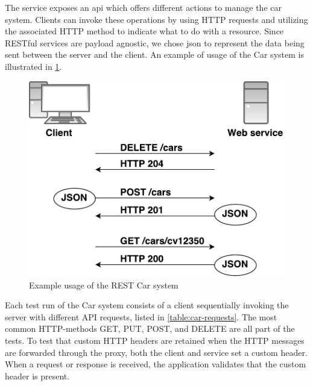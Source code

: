  The service exposes an \gls{api} which offers different actions to manage the
 car system. Clients can invoke these operations by using HTTP requests and
 utilizing the associated HTTP method to indicate what to do with a resource.
 Since RESTful services are payload agnostic, we chose \gls{json} to represent
 the data being sent between the server and the client. An example of usage of
 the Car system is illustrated in \cref{figure-rest-flow}.

\begin{figure}[h]
\centering
\includegraphics[scale=0.6]{images/rest_flow.pdf}
\caption{Example usage of the REST Car system}
\label{figure-rest-flow}
\end{figure}

Each test run of the Car system consists of a client sequentially invoking the
server with different API requests, listed in \cref{table:car-requests}. The
most common HTTP-methods GET, PUT, POST, and DELETE are all part of the tests.
To test that custom HTTP headers are retained when the HTTP messages are
forwarded through the proxy, both the client and service set a custom header.
When a request or response is received, the application validates that the
custom header is present.



